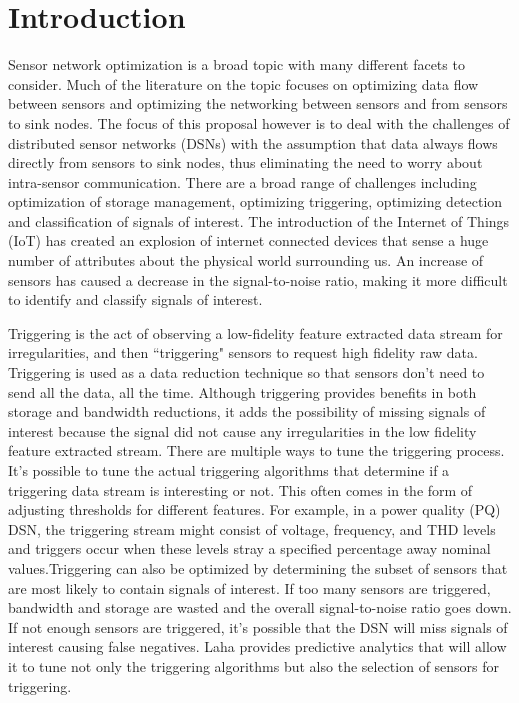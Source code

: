 \chapter{Introduction}
Sensor network optimization is a broad topic with many different facets to consider. Much of the literature on the topic focuses on optimizing data flow between sensors and optimizing the networking between sensors and from sensors to sink nodes. The focus of this proposal however is to deal with the challenges of distributed sensor networks (DSNs) with the assumption that data always flows directly from sensors to sink nodes, thus eliminating the need to worry about intra-sensor communication. There are a broad range of challenges including optimization of storage management, optimizing triggering, optimizing detection and classification of signals of interest. The introduction of the Internet of Things (IoT) has created an explosion of internet connected devices that sense a huge number of attributes about the physical world surrounding us. An increase of sensors has caused a decrease in the signal-to-noise ratio, making it more difficult to identify and classify signals of interest. 

Triggering is the act of observing a low-fidelity feature extracted data stream for irregularities, and then ``triggering" sensors to request high fidelity raw data. Triggering is used as a data reduction technique so that sensors don't need to send all the data, all the time. Although triggering provides benefits in both storage and bandwidth reductions, it adds the possibility of missing signals of interest because the signal did not cause any irregularities in the low fidelity feature extracted stream. There are multiple ways to tune the triggering process. It's possible to tune the actual triggering algorithms that determine if a triggering data stream is interesting or not. This often comes in the form of adjusting thresholds for different features. For example, in a power quality (PQ) DSN, the triggering stream might consist of voltage, frequency, and THD levels and triggers occur when these levels stray a specified percentage away nominal values.Triggering can also be optimized by determining the subset of sensors that are most likely to contain signals of interest. If too many sensors are triggered, bandwidth and storage are wasted and the overall signal-to-noise ratio goes down. If not enough sensors are triggered, it's possible that the DSN will miss signals of interest causing false negatives. Laha provides predictive analytics that will allow it to tune not only the triggering algorithms but also the selection of sensors for triggering.

